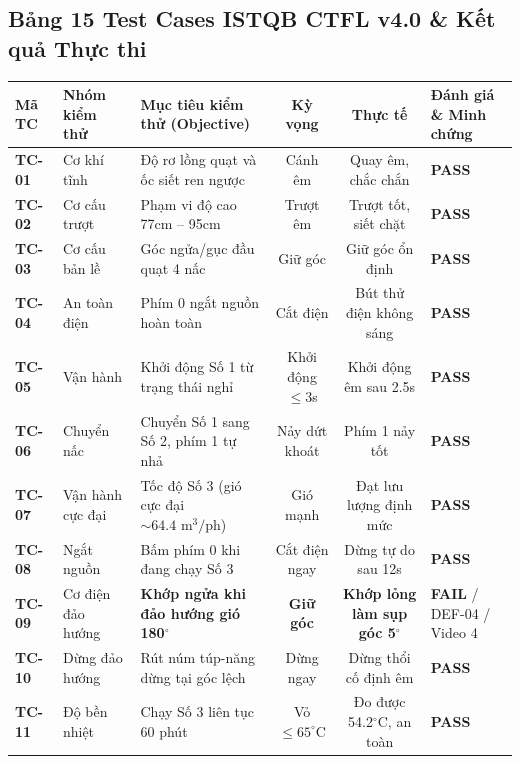 \documentclass[11pt,a4paper]{article}
\begin{document}
\subsection{Bảng 15 Test Cases ISTQB CTFL v4.0 \& Kết quả Thực thi}
\begin{table}[htbp]
\centering
\scriptsize
\begin{tabularx}{\textwidth}{@{} l p{1.8cm} X c c p{3.2cm} @{}}
\toprule
\textbf{Mã TC} & \textbf{Nhóm kiểm thử} & \textbf{Mục tiêu kiểm thử (Objective)} & \textbf{Kỳ vọng} & \textbf{Thực tế} & \textbf{Đánh giá \& Minh chứng} \\
\midrule
\textbf{TC-01} & Cơ khí tĩnh & Độ rơ lồng quạt và ốc siết ren ngược & Cánh êm & Quay êm, chắc chắn & \textbf{\color{passgreen}PASS} \\
\textbf{TC-02} & Cơ cấu trượt & Phạm vi độ cao 77cm -- 95cm & Trượt êm & Trượt tốt, siết chặt & \textbf{\color{passgreen}PASS} \\
\textbf{TC-03} & Cơ cấu bản lề & Góc ngửa/gục đầu quạt 4 nấc & Giữ góc & Giữ góc ổn định & \textbf{\color{passgreen}PASS} \\
\textbf{TC-04} & An toàn điện & Phím 0 ngắt nguồn hoàn toàn & Cắt điện & Bút thử điện không sáng & \textbf{\color{passgreen}PASS} \\
\textbf{TC-05} & Vận hành & Khởi động Số 1 từ trạng thái nghỉ & Khởi động $\le 3$s & Khởi động êm sau 2.5s & \textbf{\color{passgreen}PASS} \\
\textbf{TC-06} & Chuyển nấc & Chuyển Số 1 sang Số 2, phím 1 tự nhả & Nảy dứt khoát & Phím 1 nảy tốt & \textbf{\color{passgreen}PASS} \\
\textbf{TC-07} & Vận hành cực đại & Tốc độ Số 3 (gió cực đại $\sim 64.4\text{ m}^3/\text{ph}$) & Gió mạnh & Đạt lưu lượng định mức & \textbf{\color{passgreen}PASS} \\
\textbf{TC-08} & Ngắt nguồn & Bấm phím 0 khi đang chạy Số 3 & Cắt điện ngay & Dừng tự do sau 12s & \textbf{\color{passgreen}PASS} \\
\textbf{TC-09} & Cơ điện đảo hướng & \textbf{Khớp ngửa khi đảo hướng gió 180$^\circ$} & \textbf{Giữ góc} & \textbf{Khớp lỏng làm sụp góc 5$^\circ$} & \textbf{\color{failred}FAIL} / DEF-04 / Video 4 \\
\textbf{TC-10} & Dừng đảo hướng & Rút núm túp-năng dừng tại góc lệch & Dừng ngay & Dừng thổi cố định êm & \textbf{\color{passgreen}PASS} \\
\textbf{TC-11} & Độ bền nhiệt & Chạy Số 3 liên tục 60 phút & Vỏ $\le 65^\circ$C & Đo được 54.2$^\circ$C, an toàn & \textbf{\color{passgreen}PASS} \\

\end{tabularx}
\end{table}
\end{document}
